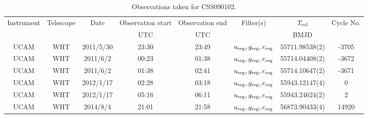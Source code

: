\begin{table}
	\begin{center}
		\caption{Observations taken for CSS090102.}
		\label{table:observing:observation logs CSS090102}
		\begin{tabular}{cccccccc}
			\hline
			Instrument & Telescope & Date & Observation start & Observation end & Filter(s) & $T_{\rm ecl}$ & Cycle No. \\
				&  &  & UTC & UTC &  & BMJD &  \\
			\hline
			\hline
			UCAM & WHT & 2011/5/30 & 23:30 & 23:49 & $u_{\rm reg},g_{\rm reg},r_{\rm reg}$ & 55711.98538(2)                                                                                                            &                                       -3705 \\
			UCAM & WHT & 2011/6/2  & 00:23 & 01:38 & $u_{\rm reg},g_{\rm reg},r_{\rm reg}$ & 55714.04408(2)                                                                                                            &                                       -3672 \\
			UCAM & WHT & 2011/6/2  & 01:38 & 02:41 & $u_{\rm reg},g_{\rm reg},r_{\rm reg}$ & 55714.10647(2)                                                                                                            &                                       -3671 \\
			UCAM & WHT & 2012/1/17 & 02:28 & 03:18 & $u_{\rm reg},g_{\rm reg},r_{\rm reg}$ & 55943.12147(4)                                                                                                            &                                           0 \\
			UCAM & WHT & 2012/1/17 & 05:16 & 06:11 & $u_{\rm reg},g_{\rm reg},r_{\rm reg}$ & 55943.24624(2)                                                                                                            &                                           2 \\
			UCAM & WHT & 2014/8/4  & 21:01 & 21:58 & $u_{\rm reg},g_{\rm reg},r_{\rm reg}$ & 56873.90433(4)                                                                                                            &                                       14920 \\
		   \hline
		\end{tabular}
	\end{center}
\end{table}